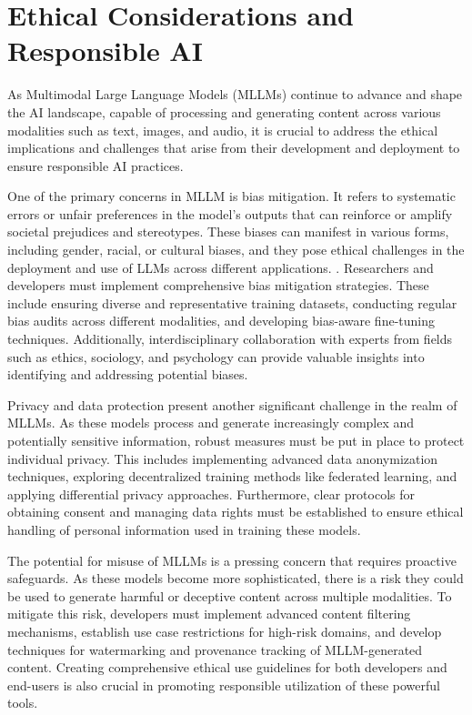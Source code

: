 \chapter{Ethical Considerations and Responsible AI}




As Multimodal Large Language Models (MLLMs) continue to advance and shape the AI landscape, capable of processing and generating content across various modalities such as text, images, and audio, it is crucial to address the ethical implications and challenges that arise from their development and deployment to ensure responsible AI practices\cite{konidena2024ethical}. 

One of the primary concerns in MLLM is bias mitigation. It refers to systematic errors or unfair preferences in the model's outputs that can reinforce or amplify societal prejudices and stereotypes. These biases can manifest in various forms, including gender, racial, or cultural biases, and they pose ethical challenges in the deployment and use of LLMs across different applications.
\cite{peng2024securing}. Researchers and developers must implement comprehensive bias mitigation strategies\cite{zhang2023mitigating}. These include ensuring diverse and representative training datasets, conducting regular bias\cite{boix2022machine} audits across different modalities\cite{pymetrics2022audit}, and developing bias-aware fine-tuning techniques\cite{kim2024domain}. Additionally, interdisciplinary collaboration with experts from fields such as ethics, sociology, and psychology can provide valuable insights into identifying and addressing potential biases\cite{aquino2023practical}.

Privacy and data protection present another significant challenge in the realm of MLLMs. As these models process and generate increasingly complex and potentially sensitive information, robust measures must be put in place to protect individual privacy\cite{he2024emerged, friha2024llm}. This includes implementing advanced data anonymization techniques, exploring decentralized training methods like federated learning, and applying differential privacy approaches. Furthermore, clear protocols for obtaining consent and managing data rights must be established to ensure ethical handling of personal information used in training these models\cite{mccoy2023ethical}.

The potential for misuse of MLLMs is a pressing concern that requires proactive safeguards. As these models become more sophisticated, there is a risk they could be used to generate harmful or deceptive content across multiple modalities\cite{chen2024trustworthy}. To mitigate this risk, developers must implement advanced content filtering mechanisms, establish use case restrictions for high-risk domains, and develop techniques for watermarking and provenance tracking of MLLM-generated content. Creating comprehensive ethical use guidelines for both developers and end-users is also crucial in promoting responsible utilization of these powerful tools.

